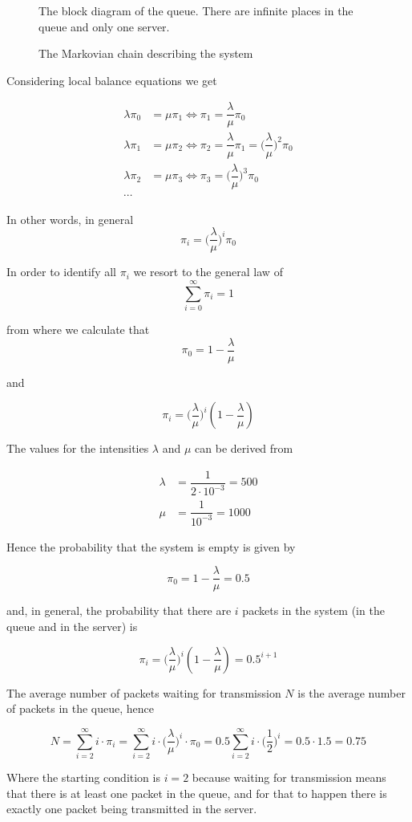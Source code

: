 \begin{figure}[H]
	\centering
	\scalebox{0.8}{}
	\caption{The block diagram of the queue. There are infinite places in the
    queue and only one server.}
\end{figure}

\begin{figure}[H]
	\centering
	\scalebox{1}{}
	\caption{The Markovian chain describing the system}
\end{figure}

Considering local balance equations we get

\begin{align*}
  \lambda \pi_0 &= \mu \pi_1 \Leftrightarrow \pi_1 = \dfrac{\lambda}{\mu}\pi_0\\
  \lambda \pi_1 &= \mu \pi_2 \Leftrightarrow \pi_2 = \dfrac{\lambda}{\mu}\pi_1 = \Big(\dfrac{\lambda}{\mu}\Big)^2\pi_0\\
  \lambda \pi_2 &= \mu \pi_3 \Leftrightarrow \pi_3 = \Big(\dfrac{\lambda}{\mu}\Big)^3\pi_0\\
  \cdots
\end{align*}

In other words, in general $$\pi_i = \Big(\dfrac{\lambda}{\mu}\Big)^i\pi_0$$

In order to identify all $\pi_i$ we resort to the general law of
$$\sum_{i=0}^{\infty} \pi_i = 1$$

from where we calculate that
$$\pi_0 = 1 - \dfrac{\lambda}{\mu}$$

and

$$\pi_i = \Big(\dfrac{\lambda}{\mu}\Big)^i(1 - \dfrac{\lambda}{\mu})$$

The values for the intensities $\lambda$ and $\mu$ can be derived from

\begin{align*}
  \lambda &= \dfrac{1}{2 \cdot 10^{-3}} = 500 \\
  \mu     &= \dfrac{1}{10^{-3}} = 1000
\end{align*}

Hence the probability that the system is empty is given by

$$\pi_0 = 1 - \dfrac{\lambda}{\mu} = 0.5$$

and, in general, the probability that there are $i$ packets in the system
(in the queue and in the server) is

$$\pi_i = \Big(\dfrac{\lambda}{\mu}\Big)^i(1 - \dfrac{\lambda}{\mu}) = 0.5^{i+1}$$

The average number of packets waiting for transmission $N$ is the average number
of packets in the queue, hence

$$N = \sum_{i=2}^{\infty} i \cdot \pi_i = \sum_{i=2}^{\infty} i \cdot \Big(\dfrac{\lambda}{\mu}\Big)^i \cdot \pi_0 =
0.5 \sum_{i=2}^{\infty} i \cdot \Big(\dfrac{1}{2}\Big)^i = 0.5 \cdot 1.5 = 0.75$$

Where the starting condition is $i=2$ because waiting for transmission means that
there is at least one packet in the queue, and for that to happen there is
exactly one packet being transmitted in the server.
